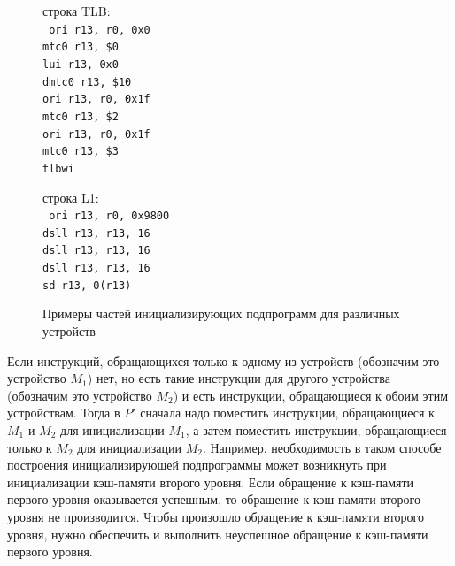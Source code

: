 \begin{figure}[h] \centering
\parbox{0.4\textwidth}{
строка TLB:\\
{\small \tt
    ori r13, r0, 0x0\\
    mtc0 r13, \$0\\
    lui r13, 0x0\\
    dmtc0 r13, \$10\\
    ori r13, r0, 0x1f\\
    mtc0 r13, \$2\\
    ori r13, r0, 0x1f\\
    mtc0 r13, \$3\\
    tlbwi\\}
} \qquad
\parbox{0.4\textwidth}{
строка L1:\\
{\small \tt
    ori r13, r0, 0x9800\\
    dsll r13, r13, 16\\
    dsll r13, r13, 16\\
    dsll r13, r13, 16\\
    sd r13, 0(r13)\\}
} \caption{Примеры частей инициализирующих подпрограмм для различных устройств}\label{fig:blocks_init_examples}
\end{figure}

Если инструкций, обращающихся только к одному из устройств (обозначим это устройство $M_1$) нет, но есть такие инструкции для другого устройства (обозначим это устройство $M_2$) и есть инструкции, обращающиеся к обоим этим устройствам. Тогда в $P'$ сначала надо поместить инструкции, обращающиеся к $M_1$ и $M_2$ для инициализации $M_1$, а затем поместить инструкции, обращающиеся только к $M_2$ для инициализации $M_2$. Например, необходимость в таком способе построения инициализирующей подпрограммы может возникнуть при инициализации кэш-памяти второго уровня. Если обращение к кэш-памяти первого уровня оказывается успешным, то обращение к кэш-памяти второго уровня не производится. Чтобы произошло обращение к кэш-памяти второго уровня, нужно обеспечить и выполнить неуспешное обращение к кэш-памяти первого уровня.


